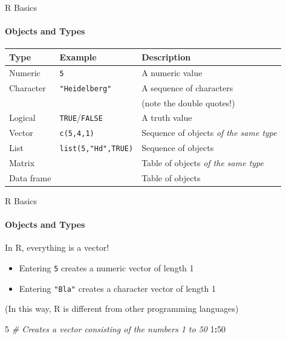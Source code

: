 \documentclass[ignorenonframetext,]{beamer}
\newenvironment{Shaded}{\begin{snugshade}}{\end{snugshade}}
\newcommand{\CommentTok}[1]{\textcolor[rgb]{0.56,0.35,0.01}{\textit{#1}}}
\newcommand{\DecValTok}[1]{\textcolor[rgb]{0.00,0.00,0.81}{#1}}
\newcommand{\OperatorTok}[1]{\textcolor[rgb]{0.81,0.36,0.00}{\textbf{#1}}}
\providecommand{\tightlist}{%
  \setlength{\itemsep}{0pt}\setlength{\parskip}{0pt}}
\begin{document}
\begin{frame}[fragile]{R Basics}
\protect\hypertarget{r-basics-2}{}

\framesubtitle{Objects and Types}

\small

\begin{longtable}[]{@{}lll@{}}
\toprule
Type & Example & Description\tabularnewline
\midrule
\endhead
Numeric & \texttt{5} & A numeric value\tabularnewline
Character & \texttt{"Heidelberg"} & A sequence of
characters\tabularnewline
& & (note the double quotes!)\tabularnewline
Logical & \texttt{TRUE}/\texttt{FALSE} & A truth value\tabularnewline
Vector & \texttt{c(5,4,1)} & Sequence of objects \emph{of the same
type}\tabularnewline
List & \texttt{list(5,"Hd",TRUE)} & Sequence of objects\tabularnewline
Matrix & & Table of objects \emph{of the same type}\tabularnewline
Data frame & & Table of objects\tabularnewline
\bottomrule
\end{longtable}

\end{frame}

\begin{frame}[fragile]{R Basics}
\protect\hypertarget{r-basics-3}{}

\framesubtitle{Objects and Types}

In R, everything is a vector!

\begin{itemize}
\tightlist
\item
  Entering \texttt{5} creates a numeric vector of length 1
\item
  Entering \texttt{"Bla"} creates a character vector of length 1
\end{itemize}

(In this way, R is different from other programming languages)

\begin{Shaded}
\begin{Highlighting}[]
\DecValTok{5}
\CommentTok{# Creates a vector consisting of the numbers 1 to 50}
\DecValTok{1}\OperatorTok{:}\DecValTok{50}
\end{Highlighting}
\end{Shaded}

\end{frame}
\end{document}
